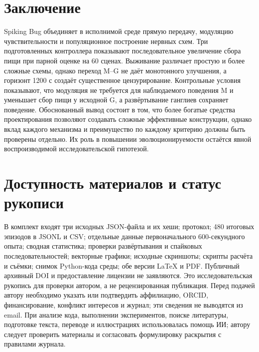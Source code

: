 \documentclass[11pt]{article}
\begin{document}
\section{Заключение}
Spiking Bug объединяет в исполнимой среде прямую передачу, модуляцию чувствительности и популяционное построение нервных схем. Три подготовленных контроллера показывают последовательное увеличение сбора пищи при парной оценке на 60 сценах. Выживание различает простую и более сложные схемы, однако переход M--G не даёт монотонного улучшения, а горизонт 1200 с создаёт существенное цензурирование. Контрольные условия показывают, что модуляция не требуется для наблюдаемого поведения M и уменьшает сбор пищи у исходной G, а развёртывание ганглиев сохраняет поведение. Обоснованный вывод состоит в том, что более богатые средства проектирования позволяют создавать сложные эффективные конструкции, однако вклад каждого механизма и преимущество по каждому критерию должны быть проверены отдельно. Их роль в повышении эволюционируемости остаётся явной воспроизводимой исследовательской гипотезой.

\section*{Доступность материалов и статус рукописи}
В комплект входят три исходных JSON-файла и их хеши; протокол; 480 итоговых эпизодов в JSONL и CSV; отдельные данные первоначального 600-секундного опыта; сводная статистика; проверки развёртывания и спайковых последовательностей; векторные графики; исходные скриншоты; скрипты расчёта и съёмки; снимок Python-кода среды; обе версии LaTeX и PDF. Публичный архивный DOI и предоставление лицензии не заявляются. Это исследовательская рукопись для проверки автором, а не рецензированная публикация. Перед подачей автору необходимо указать или подтвердить аффилиацию, ORCID, финансирование, конфликт интересов и журнал; эти сведения не выводятся из email. При анализе кода, выполнении экспериментов, поиске литературы, подготовке текста, переводе и иллюстрациях использовалась помощь ИИ; автору следует проверить материалы и согласовать формулировку раскрытия с правилами журнала.

\FloatBarrier
\appendix
\end{document}
